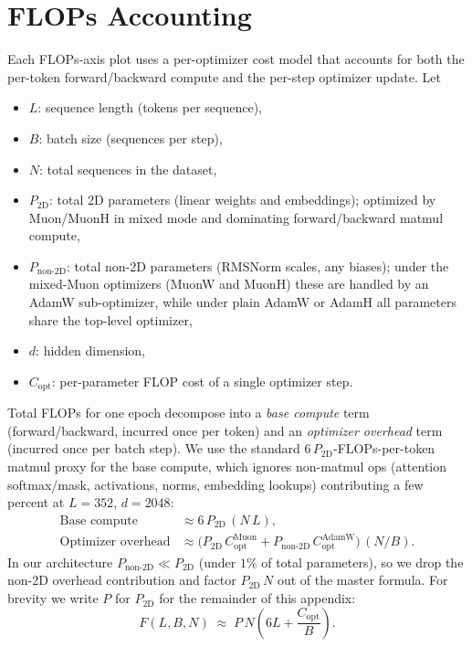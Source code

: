 \documentclass{article}
\begin{document}
\section{FLOPs Accounting}
\label{app:FLOPs}

Each FLOPs-axis plot uses a per-optimizer cost model that accounts for both the per-token forward/backward compute and the per-step optimizer update. Let
\begin{itemize}
  \item $L$: sequence length (tokens per sequence),
  \item $B$: batch size (sequences per step),
  \item $N$: total sequences in the dataset,
  \item $P_{\text{2D}}$: total 2D parameters (linear weights and embeddings); optimized by Muon/MuonH in mixed mode and dominating forward/backward matmul compute,
  \item $P_{\text{non-2D}}$: total non-2D parameters (RMSNorm scales, any biases); under the mixed-Muon optimizers (MuonW and MuonH) these are handled by an AdamW sub-optimizer, while under plain AdamW or AdamH all parameters share the top-level optimizer,
  \item $d$: hidden dimension,
  \item $C_{\text{opt}}$: per-parameter FLOP cost of a single optimizer step.
\end{itemize}

Total FLOPs for one epoch decompose into a \emph{base compute} term (forward/backward, incurred once per token) and an \emph{optimizer overhead} term (incurred once per batch step). We use the standard $6\,P_{\text{2D}}$-FLOPs-per-token matmul proxy for the base compute, which ignores non-matmul ops (attention softmax/mask, activations, norms, embedding lookups) contributing a few percent at $L = 352$, $d = 2048$:
\begin{align*}
\text{Base compute} &\approx 6\,P_{\text{2D}}\,(N\,L), \\
\text{Optimizer overhead} &\approx \bigl(P_{\text{2D}}\,C_{\text{opt}}^{\text{Muon}} + P_{\text{non-2D}}\,C_{\text{opt}}^{\text{AdamW}}\bigr)\,(N/B).
\end{align*}
In our architecture $P_{\text{non-2D}} \ll P_{\text{2D}}$ (under $1\%$ of total parameters), so we drop the non-2D overhead contribution and factor $P_{\text{2D}}\,N$ out of the master formula. For brevity we write $P$ for $P_{\text{2D}}$ for the remainder of this appendix:
\[
F(L, B, N) \;\approx\; P\,N\!\left(6L + \frac{C_{\text{opt}}}{B}\right).
\]
\end{document}
